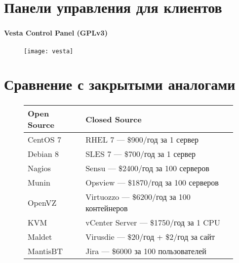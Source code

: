 
\section{Панели управления для клиентов}

\begin{frame}
\frametitle{\insertsection}
\framesubtitle{Vesta Control Panel (GPLv3)}
\begin{figure}[h]
	\begin{center}
		\texttt{[image: vesta]}
	\end{center}
\end{figure}
\end{frame}


\section{Сравнение с закрытыми аналогами}

\begin{frame}
\frametitle{\insertsection}
\begin{figure}[h]
	\begin{center}
		\begin{tabular}{|l|p{7.5cm}|}
			\hline
			\bf{Open Source} & \bf{Closed Source} \\ \hline
			CentOS 7 & RHEL 7 --- \$900/год за 1 сервер \\
			Debian 8 & SLES 7 --- \$700/год за 1 сервер \\ \hline
			Nagios & Sensu --- \$2400/год за 100 серверов \\
			Munin & Opsview --- \$1870/год за 100 серверов \\ \hline
			OpenVZ & Virtuozzo --- \$6200/год за 100 контейнеров \\
			KVM & vCenter Server --- \$1750/год за 1 CPU \\ \hline
			Maldet & Virusdie --- \$20/год + \$2/год за сайт \\
			MantisBT & Jira --- \$6000 за 100 пользователей \\
			\hline
		\end{tabular}
	\end{center}
\end{figure}
\end{frame}

